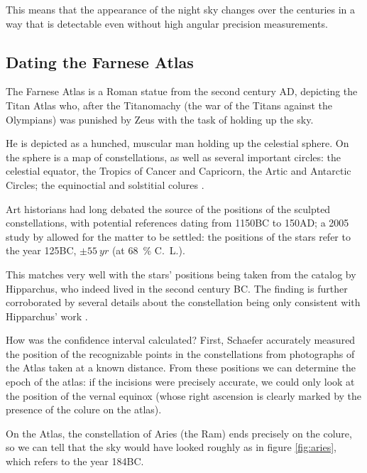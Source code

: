 \documentclass[main.tex]{subfiles}
\begin{document}
This means that the appearance of the night sky changes over the centuries in a way that is detectable even without high angular precision measurements. 

\subsection{Dating the Farnese Atlas}

The Farnese Atlas is a Roman statue from the second century AD, depicting the Titan Atlas who, after the Titanomachy (the war of the Titans against the Olympians) was punished by Zeus with the task of holding up the sky.

He is depicted as a hunched, muscular man holding up the celestial sphere. On the sphere is a map of constellations, as well as several important circles: the celestial equator, the Tropics of Cancer and Capricorn, the Artic and Antarctic Circles; the equinoctial and solstitial colures \cite[table 4]{schaeferEpochConstellationsFarnese2005}. 

Art historians had long debated the source of the positions of the sculpted constellations, with potential references dating from 1150BC to 150AD; a 2005 study by \textcite[]{schaeferEpochConstellationsFarnese2005} allowed for the matter to be settled: the positions of the stars refer to the year 125BC, \(\pm \SI{55}{yr}\) (at \SI{68}{\percent} C.\ L.).

This matches very well with the stars' positions being taken from the catalog by Hipparchus, who indeed lived in the second century BC. 
The finding is further corroborated by several details about the constellation being only consistent with Hipparchus' work \cite[sec.\ 2]{schaeferEpochConstellationsFarnese2005}.

How was the confidence interval calculated? First, Schaefer accurately measured the position of the recognizable points in the constellations from photographs of the Atlas taken at a known distance.
From these positions we can determine the epoch of the atlas: if the incisions were precisely accurate, we could only look at the position of the vernal equinox (whose right ascension is clearly marked by the presence of the colure on the atlas).

On the Atlas, the constellation of Aries (the Ram) ends precisely on the colure, so we can tell that the sky would have looked roughly as in figure \ref{fig:aries}, which refers to the year 184BC. 

\end{document}
